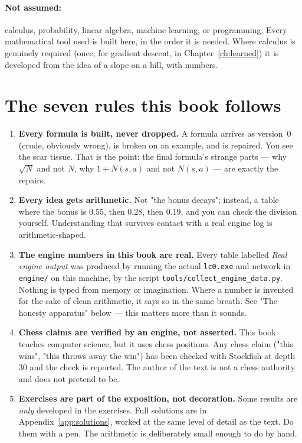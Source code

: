 \paragraph{Not assumed:} calculus, probability, linear algebra, machine learning, or
programming. Every mathematical tool used is built here, in the order it is needed. Where
calculus is genuinely required (once, for gradient descent, in Chapter~\ref{ch:learned}) it
is developed from the idea of a slope on a hill, with numbers.

\section*{The seven rules this book follows}

\begin{enumerate}
\item \textbf{Every formula is built, never dropped.} A formula arrives as version~0
  (crude, obviously wrong), is broken on an example, and is repaired. You see the scar
  tissue. That is the point: the final formula's strange parts --- why $\sqrt{N}$ and not
  $N$, why $1+N(s,a)$ and not $N(s,a)$ --- are exactly the repairs.

\item \textbf{Every idea gets arithmetic.} Not "the bonus decays"; instead, a table where
  the bonus is $0.55$, then $0.28$, then $0.19$, and you can check the division yourself.
  Understanding that survives contact with a real engine log is arithmetic-shaped.

\item \textbf{The engine numbers in this book are real.} Every table labelled
  \emph{Real engine output} was produced by running the actual \texttt{lc0.exe} and network
  in \texttt{engine/} on this machine, by the script
  \texttt{tools/collect\_engine\_data.py}. Nothing is typed from memory or imagination.
  Where a number is invented for the sake of clean arithmetic, it says so in the same
  breath. See "The honesty apparatus" below --- this matters more than it sounds.

\item \textbf{Chess claims are verified by an engine, not asserted.} This book teaches
  computer science, but it uses chess positions. Any chess claim ("this wins", "this
  throws away the win") has been checked with Stockfish at depth 30 and the check is
  reported. The author of the text is not a chess authority and does not pretend to be.

\item \textbf{Exercises are part of the exposition, not decoration.} Some results are
  \emph{only} developed in the exercises. Full solutions are in Appendix~\ref{app:solutions},
  worked at the same level of detail as the text. Do them with a pen. The arithmetic is
  deliberately small enough to do by hand.


\end{enumerate}
